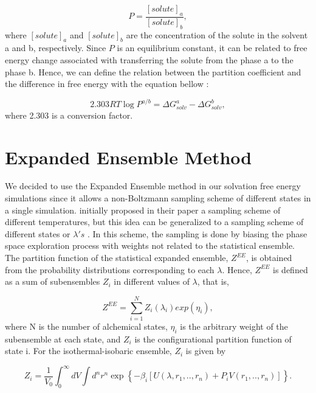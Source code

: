 \begin{equation}
P = \dfrac{[solute]_{a}}{[solute]_{b}},
\end{equation} 
where $[solute]_{a}$ and $[solute]_{b}$ are the concentration of the solute in the solvent a and b, respectively. Since $P$ is an equilibrium constant, it can be related to free energy change associated with transferring the solute from the phase a to the phase b. Hence, we can define the relation between the partition coefficient and the difference in free energy with the equation bellow \cite{doi:10.1021/ja00036a009}:  

\begin{equation}
\label{eqn:partcoe}
{2.303RT} \log{P}^{a/b} ={\Delta G_{solv}^{a} - \Delta G_{solv}^{b}},
\end{equation}
where 2.303 is a conversion factor.

\section{Expanded Ensemble Method}\label{ee}

We decided to use the Expanded Ensemble method \cite{lyubartsev} in our solvation free energy simulations since it allows a non-Boltzmann sampling scheme of different states in a single simulation.  initially proposed in their paper a sampling scheme of different temperatures, but this idea can be generalized to a sampling scheme of different states or $\lambda 's$ \cite{escobedo2007}. In this scheme, the sampling is done by biasing the phase space exploration process with weights not related to the statistical ensemble. The partition function of the statistical expanded ensemble, $Z^{EE}$, is obtained from the probability distributions corresponding to each $\lambda$. Hence, $Z^{EE}$ is defined as a sum of subensembles $Z_{i}$ in different values of $\lambda$, that is,

\begin{equation}
Z^{EE} = \sum_{i=1}^{N} Z_{i}(\lambda_{i}) exp(\eta_{i}),
\label{eqn:ee}
\end{equation}   
where N is the number of alchemical states, $\eta_{i}$ is the arbitrary weight of the subensemble at each state, and $Z_{i}$ is the configurational partition function of state i. For the isothermal-isobaric ensemble, $Z_{i}$ is given by

\begin{equation}
Z_{i} = \frac{1}{V_{0}} {\int_{0}^{\infty} dV \int d^{n}r^{n} \exp \left \lbrace -\beta_{i} \left[ U(\lambda, r_{1},..,r_{n}) + P_{i}V(r_{1},..,r_{n}) \right] \right \rbrace}.
\end{equation} 

